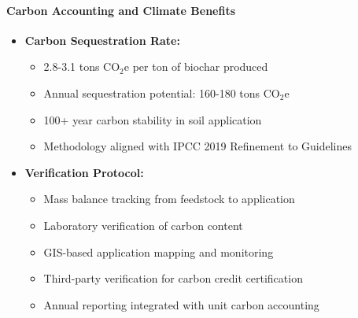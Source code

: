 \paragraph{Carbon Accounting and Climate Benefits}
\label{sec:biochar_carbon_capture}
\begin{itemize}
    \item \textbf{Carbon Sequestration Rate:}
    \begin{itemize}
        \item 2.8-3.1 tons CO$_2$e per ton of biochar produced
        \item Annual sequestration potential: 160-180 tons CO$_2$e
        \item 100+ year carbon stability in soil application
        \item Methodology aligned with IPCC 2019 Refinement to Guidelines
    \end{itemize}
    
    \item \textbf{Verification Protocol:}
    \begin{itemize}
        \item Mass balance tracking from feedstock to application
        \item Laboratory verification of carbon content
        \item GIS-based application mapping and monitoring
        \item Third-party verification for carbon credit certification
        \item Annual reporting integrated with unit carbon accounting
    \end{itemize}
\end{itemize}

